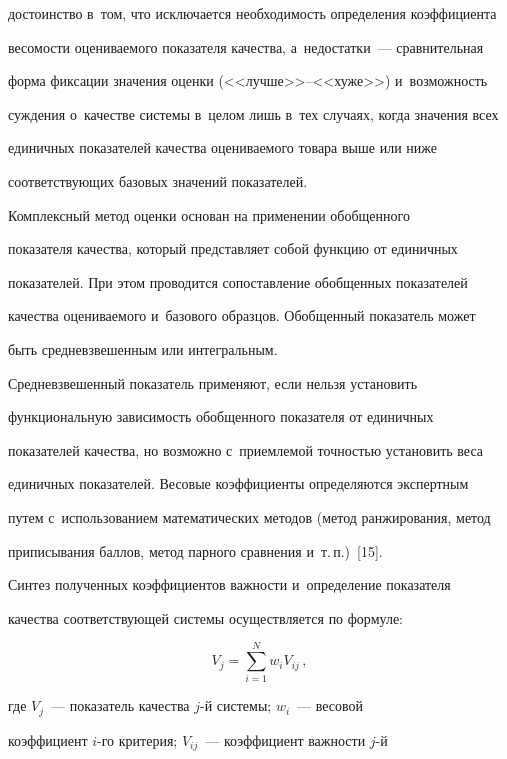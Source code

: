 достоинство в~том, что исключается необходимость определения коэффициента 

весомости оцениваемого показателя качества, а~недостатки~--- сравнительная 

форма фиксации значения оценки (<<луч\-ше>>--<<ху\-же>>) и~воз\-мож\-ность 

суж\-де\-ния о~качестве сис\-те\-мы в~целом лишь в~тех случаях, когда значения всех 

единичных показателей качества оце\-ни\-ва\-емо\-го товара выше или ниже 

со\-от\-вет\-ст\-ву\-ющих базовых значений показателей.

     

     Комплексный метод оценки основан на применении обобщенного 

показателя качества, который пред\-став\-ля\-ет собой функцию от единичных 

показателей. При этом проводится со\-по\-став\-ле\-ние обобщенных показателей 

качества оце\-ни\-ва\-емо\-го и~базового образцов. Обобщенный показатель может 

быть сред\-не\-взве\-шен\-ным или интегральным.

     

     Средневзвешенный показатель применяют, если нельзя установить 

функциональную за\-ви\-си\-мость обобщенного показателя от единичных 

показателей качества, но возможно с~при\-ем\-ле\-мой точ\-ностью установить веса 

единичных показателей. Весовые коэффициенты определяются экспертным 

путем с~использованием математических методов (метод ранжирования, метод 

приписывания баллов, метод пар\-но\-го сравнения и~т.\,п.)~[15]. 

     

      Синтез полученных коэффициентов важности и~определение показателя 

качества со\-от\-вет\-ст\-ву\-ющей сис\-те\-мы осуществляется по формуле:

     $$

     V_j=\sum\limits^N_{i=1} w_i V_{ij}\,,

     $$

где $V_j$~--- показатель качества $j$-й сис\-те\-мы; $w_i$~--- весовой 

коэффициент $i$-го критерия; $V_{ij}$~--- коэффициент важ\-ности $j$-й  

